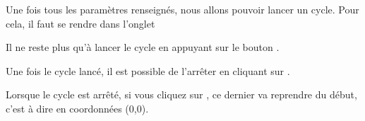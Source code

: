 Une fois tous les paramètres renseignés, nous allons pouvoir lancer un cycle. Pour cela, il faut se rendre dans l'onglet 

Il ne reste plus qu'à lancer le cycle en appuyant sur le bouton .


Une fois le cycle lancé, il est possible de l’arrêter en cliquant sur .


Lorsque le cycle est arrêté, si vous cliquez sur , ce dernier va reprendre du début, c'est à dire en coordonnées (0,0).









